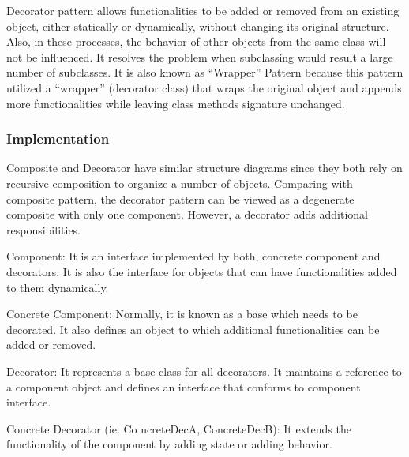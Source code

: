 \begin{summary}
    Decorator pattern allows functionalities to be added or removed from an
    existing object, either statically or dynamically, without changing its
    original structure. Also, in these processes, the behavior of other objects
    from the same class will not be influenced. It resolves the problem when
    subclassing would result a large number of subclasses. It is also known
    as ``Wrapper'' Pattern because this pattern utilized a ``wrapper'' (decorator class)
    that wraps the original object and appends more functionalities while leaving
    class methods signature unchanged.
\end{summary}

\subsubsection{Implementation}
Composite and Decorator have similar structure diagrams since they both rely on
recursive composition to organize a number of objects. Comparing with composite
pattern, the decorator pattern can be viewed as a degenerate composite with
only one component. However, a decorator adds additional responsibilities.

Component: It is an interface implemented by both, concrete component and
decorators. It is also the interface for objects that can have functionalities
added to them dynamically.

Concrete Component: Normally, it is known as a base which needs to be
decorated. It also defines an object to which additional functionalities can be
added or removed.

Decorator: It represents a base class for all decorators. It maintains a
reference to a component object and defines an interface that conforms to
component interface.

Concrete Decorator (ie. Co ncreteDecA, ConcreteDecB): It extends the
functionality of the component by adding state or adding behavior.


